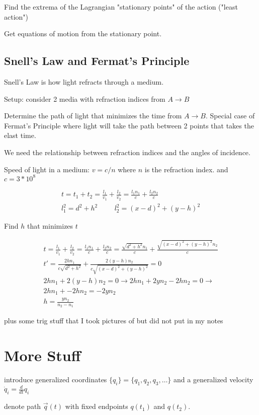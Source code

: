 \documentclass[fleqn]{report}
\newcommand{\hp}{\hspace{1cm}}
\newcommand{\equations} [1] {
\begin{gather*}
#1
\end{gather*}
}
\begin{document}
Find the extrema of the Lagrangian "stationary points" of the action 
("least action")

Get equations of motion from the stationary point. 

\subsection{Snell's Law and Fermat's Principle}
Snell's Law is how light refracts through a medium. 

Setup: consider 2 media with refraction indices from $A \to B$

Determine the path of light that minimizes the time from $A \to B$.
Special case of Fermat's Principle where light will take the path 
between 2 points that takes the elast time.

We need the relationship between refraction indices and the angles of incidence. 

Speed of light in a medium: $v = c / n$ where $n$ is the refraction index. and 
$c = 3 * 10^8$

\equations{
    t = t_1 + t_2 = \frac{l_1}{v_1} + \frac{l_2}{v_2} = 
    \frac{l_1n_1}{c} + \frac{l_2n_2}{c}
    \\
    l_1^2 = d^2 + h^2 
    \hp 
    l_2^2 = (x - d)^2 + (y - h)^2
}
Find $h$ that minimizes $t$
\equations{
    t = \frac{l_1}{v_1} + \frac{l_2}{v_2} = 
    \frac{l_1n_1}{c} + \frac{l_2n_2}{c}
    =
    \frac{\sqrt{d^2 + h^2} n_1}{c} + \frac{\sqrt{(x - d)^2 + (y - h)^2} n_2}{c}
    \\
    t' = 
    \frac{2h n_1}{c\sqrt{d^2 + h^2}} + 
    \frac{2 (y - h) n_2}{c\sqrt{(x - d)^2 + (y - h)^2}}
    = 0
    \\
    2h n_1 + 
    2 (y - h) n_2
    = 0
    \rightarrow 
    2h n_1 + 
    2 y n_2 - 2 h n_2
    = 0
    \rightarrow 
    \\
    2h n_1 + 
     - 2 h n_2
    = -2 y n_2
    \\
    h = \frac{y n_2}{n_2 - n_1}
}
plus some trig stuff that I took pictures of but did not 
put in my notes 

\section{More Stuff}
introduce generalized coordinates $\{ q_i \} = \{ q_1, q_2, q_3, \ldots \}$
and a generalized velocity $\dot q_i = \frac{d}{dt} q_i$

denote path $\vec q(t)$ with fixed endpoints $q(t_1)$ and $q(t_2)$.
\end{document}
